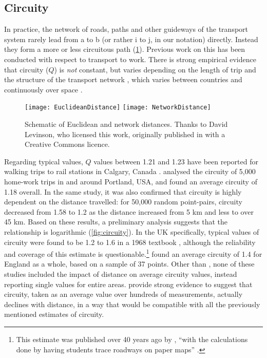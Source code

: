 \subsection{Circuity} \label{scircuity}   
In practice, the
network of roads, paths and other guideways of the transport system
rarely lead from a to b (or rather
i to j, in our notation) directly. Instead they
form a more or less circuitous path (\cref{fig:routes}). Previous work on this has
been conducted with respect to transport to work. There is strong empirical
evidence that circuity ($Q$) is \emph{not} constant, but varies depending on
the length of trip \citep{Levinson2009} and the structure of the transport
network \citep{parthasarathi2012network}, which varies between countries
\citep{Ballou2002} and continuously over space \citep{Barthelemy2011}.

\begin{figure}[h]
 \centering
 \texttt{[image: EuclideanDistance]}
  \texttt{[image: NetworkDistance]}
 \caption[Schematic of Euclidean and network distances]{Schematic of
 Euclidean and network distances. Thanks to David Levinson, who licensed this
 work, originally published in \citet{Levinson2009} with a Creative Commons licence.}
 \label{fig:routes}
\end{figure}

Regarding
typical values, $Q$ values between 1.21 and 1.23 have been reported for
walking trips to rail stations in Calgary, Canada \citep{O'Sullivan1996}.
\citet{Levinson2009} analysed the circuity of 5,000 home-work trips in and
around Portland, USA, and found an average circuity of 1.18 overall. In the
same study, it was also confirmed that
circuity is highly dependent on the distance travelled: for 50,000 random
point-pairs, circuity decreased from 1.58 to 1.2 as the distance increased from
5 km and less to over 45 km. Based on these results, a preliminary analysis
suggests that the relationship is logarithmic (\cref{fig:circuity}). In
the UK specifically, typical values of circuity were found to be
1.2 to 1.6 in a 1968 textbook \citep{bosco2012circs},
although the reliability and
coverage of this estimate is
questionable.\footnote{This estimate
was published over 40 years ago by \citet{cole1968quantitative},
``with the calculations done by having
students trace roadways on paper maps'' \citep[189]{bosco2012circs}.
}
\citet{Ballou2002} found an average circuity of 1.4 for England
as a whole, based on a sample of 37 points. Other than \citet{Levinson2009},
none of these studies
included the impact of distance on average circuity
values, instead reporting single values for entire areas.
\citet{Levinson2009} provide strong evidence to suggest that
circuity, taken as an average value over hundreds of measurements,
actually declines with distance, in a way that would be compatible
with all the previously mentioned estimates of circuity.

